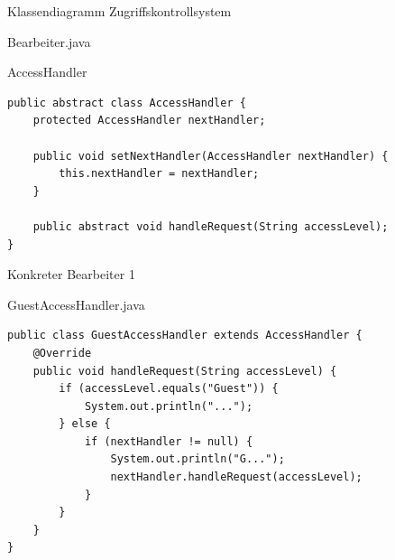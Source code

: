 \begin{frame}{Klassendiagramm Zugriffskontrollsystem}
\end{frame}

\begin{frame}[fragile]{Bearbeiter.java}
	\begin{exampleblock}{AccessHandler}
 		\begin{lstlisting}
public abstract class AccessHandler {
    protected AccessHandler nextHandler;

    public void setNextHandler(AccessHandler nextHandler) {
        this.nextHandler = nextHandler;
    }

    public abstract void handleRequest(String accessLevel);
}
 		\end{lstlisting}
 	\end{exampleblock}
\end{frame}

\begin{frame}[fragile]{Konkreter Bearbeiter 1}
	\begin{exampleblock}{GuestAccessHandler.java}
 		\begin{lstlisting}
public class GuestAccessHandler extends AccessHandler {
    @Override
    public void handleRequest(String accessLevel) {
        if (accessLevel.equals("Guest")) {
            System.out.println("...");
        } else {
            if (nextHandler != null) {
                System.out.println("G...");
                nextHandler.handleRequest(accessLevel);
            }
        }
    }
}
 		\end{lstlisting}
 	\end{exampleblock}
\end{frame}

